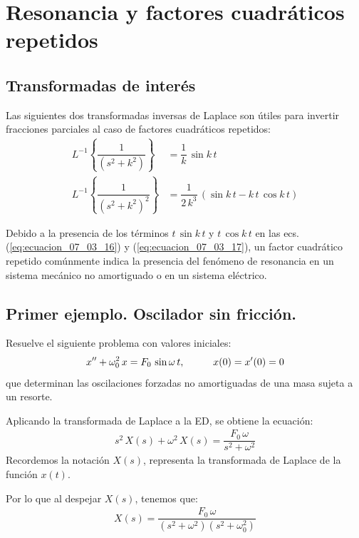 \section{Resonancia y factores cuadráticos repetidos}
\subsection{Transformadas de interés}

Las siguientes dos transformadas inversas de Laplace son útiles para invertir fracciones parciales al caso de factores cuadráticos repetidos:
\begin{align}
L^{-1} \left\{ \dfrac{1}{(s^{2} + k^{2})} \right\} &= \dfrac{1}{ k} \, \sin k \, t \label{eq:ecuacion_07_03_16} \\[0.5em]
L^{-1} \left\{ \dfrac{1}{(s^{2} + k^{2})^{2}} \right\} &= \dfrac{1}{2 \, k^{3}} \, (\sin k \, t - k \, t \, \cos k \, t) \label{eq:ecuacion_07_03_17}
\end{align}

Debido a la presencia de los términos $t \, \sin k \, t$ y $t \, \cos k \, t$ en las ecs. (\ref{eq:ecuacion_07_03_16}) y (\ref{eq:ecuacion_07_03_17}), un factor cuadrático repetido comúnmente indica la presencia del fenómeno de resonancia en un sistema mecánico no amortiguado o en un sistema eléctrico.

\subsection{Primer ejemplo. Oscilador sin fricción.}

Resuelve el siguiente problema con valores iniciales:
\begin{align*}
{x}^{\prime \prime} + \omega_{0}^{2} \, x = F_{0} \, \sin \omega \, t, \hspace{1cm} x(0) = {x}^{\prime} (0) = 0
\end{align*}
que determinan las oscilaciones forzadas no amortiguadas de una masa sujeta a un resorte.

Aplicando la transformada de Laplace a la ED, se obtiene la ecuación:
\begin{align*}
s^{2} \, X(s) + \omega^{2} \, X(s) = \dfrac{F_{0} \, \omega}{s^{2} + \omega^{2}}
\end{align*}
Recordemos la notación $X(s)$, representa la transformada de Laplace de la función $x(t)$.
\par
Por lo que al despejar $X(s)$, tenemos que:
\begin{align*}
X(s) = \dfrac{F_{0} \, \omega}{(s^{2} + \omega^{2})(s^{2} + \omega_{0}^{2})}
\end{align*}

